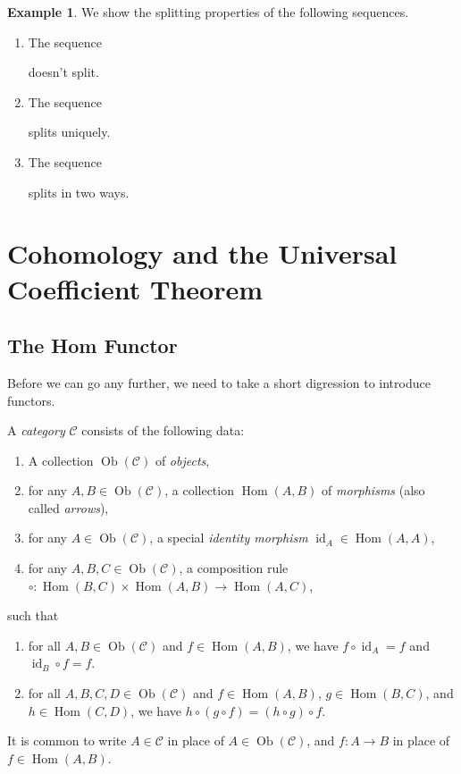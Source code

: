 \documentclass{book}
\newcommand{\scrC}{\mathscr{C}}
\newcommand{\bbZ}{\mathbb{Z}}
\DeclareMathOperator{\id}{id}
\DeclareMathOperator{\pr}{pr}
\DeclareMathOperator{\Ob}{Ob}
\DeclareMathOperator{\Hom}{Hom}
\theoremstyle{definition}
\newtheorem{example}[theorem]{Example}
\theoremstyle{remark}
\numberwithin{equation}{section}
\begin{document}
\begin{example}
    We show the splitting properties of the following sequences.
    \begin{enumerate}[label=(\arabic*)]
        \item The sequence 
        doesn't split.
        \item The sequence
        splits uniquely.
        \item The sequence
        splits in two ways.
    \end{enumerate}
\end{example}

        
\chapter{Cohomology and the Universal Coefficient Theorem}
\section{The Hom Functor}
Before we can go any further, we need to take a short digression to introduce functors.

A \textit{category} $\scrC$ consists of the following data:
\begin{enumerate}[label=(\arabic*)]
    \item A collection $\Ob(\scrC)$ of \textit{objects},
    \item for any $A,B \in \Ob(\scrC)$, a collection $\Hom(A,B)$ of \textit{morphisms} (also called \textit{arrows}),
    \item for any $A \in \Ob(\scrC)$, a special \textit{identity morphism} $\id_A \in \Hom(A,A)$,
    \item for any $A,B,C \in \Ob(\scrC)$, a composition rule $\circ \colon \Hom(B,C) \times \Hom(A,B) \to \Hom(A,C)$,
\end{enumerate}
such that 
\begin{enumerate}[label=(\alph*)]
    \item for all $A,B \in \Ob(\scrC)$ and $f \in \Hom(A,B)$, we have $f \circ \id_A = f$ and $\id_B \circ f = f$.
    \item for all $A,B,C,D \in \Ob(\scrC)$ and $f \in \Hom(A,B)$, $g \in \Hom(B,C)$, and $h \in \Hom(C,D)$, we have $h \circ (g \circ f) = (h \circ g) \circ f$.
\end{enumerate}
It is common to write $A \in \scrC$ in place of $A \in \Ob(\scrC)$, and $f \colon A \to B$ in place of $f \in \Hom(A,B)$.
\end{document}
